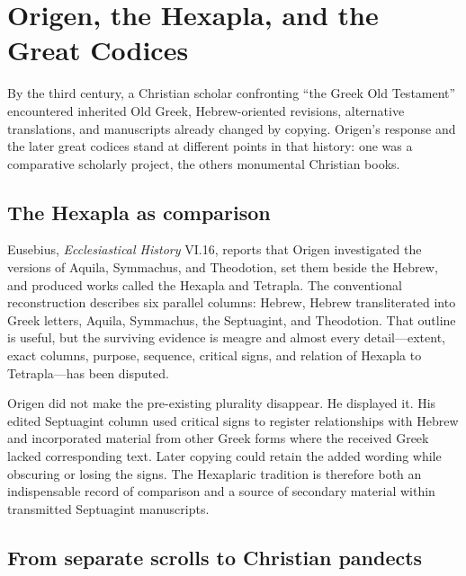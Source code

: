 \section{Origen, the Hexapla, and the Great Codices}

By the third century, a Christian scholar confronting ``the Greek Old Testament'' encountered inherited Old Greek, Hebrew-oriented revisions, alternative translations, and manuscripts already changed by copying. Origen's response and the later great codices stand at different points in that history: one was a comparative scholarly project, the others monumental Christian books.

\subsection{The Hexapla as comparison}

Eusebius, \emph{Ecclesiastical History} VI.16, reports that Origen investigated the versions of Aquila, Symmachus, and Theodotion, set them beside the Hebrew, and produced works called the Hexapla and Tetrapla. The conventional reconstruction describes six parallel columns: Hebrew, Hebrew transliterated into Greek letters, Aquila, Symmachus, the Septuagint, and Theodotion. That outline is useful, but the surviving evidence is meagre and almost every detail---extent, exact columns, purpose, sequence, critical signs, and relation of Hexapla to Tetrapla---has been disputed.

Origen did not make the pre-existing plurality disappear. He displayed it. His edited Septuagint column used critical signs to register relationships with Hebrew and incorporated material from other Greek forms where the received Greek lacked corresponding text. Later copying could retain the added wording while obscuring or losing the signs. The Hexaplaric tradition is therefore both an indispensable record of comparison and a source of secondary material within transmitted Septuagint manuscripts.


\subsection{From separate scrolls to Christian pandects}

